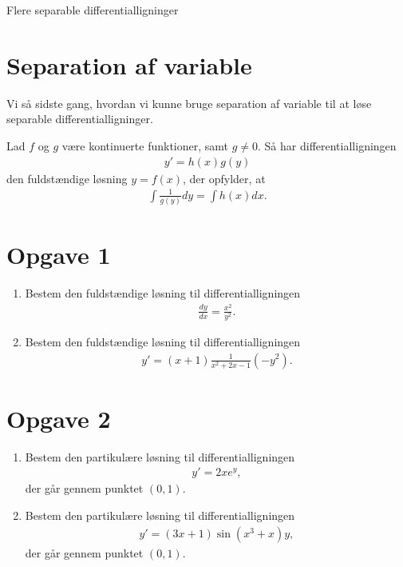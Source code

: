 \begin{center}
\Huge
Flere separable differentialligninger
\end{center}

\section*{Separation af variable}
Vi så sidste gang, hvordan vi kunne bruge separation af variable til at løse separable differentialligninger.
\begin{setn}
	Lad $f$ og $g$ være kontinuerte funktioner, samt $g \neq 0$. 
	Så har differentialligningen
	\begin{align*}
		y' = h(x)g(y)
	\end{align*}
	den fuldstændige løsning $y = f(x)$, der opfylder, at 
	\begin{align*}
		\int \frac{1}{g(y)}dy = \int h(x) dx.
	\end{align*}
\end{setn}


\section*{Opgave 1}
\begin{enumerate}[label=\roman*)]
	\item Bestem den fuldstændige løsning til differentialligningen
	\begin{align*}
		\frac{dy}{dx} = \frac{x^2}{y^2}.
	\end{align*}
	\item Bestem den fuldstændige løsning til differentialligningen
	\begin{align*}
		y' = (x+1)\frac{1}{x^2+2x-1}(-y^2).
	\end{align*}
\end{enumerate}


\section*{Opgave 2}
\begin{enumerate}[label=\roman*)]
	\item Bestem den partikulære løsning til differentialligningen
	\begin{align*}
		y' = 2xe^y,
	\end{align*}
	der går gennem punktet $(0,1)$.
	\item Bestem den partikulære løsning til differentialligningen 
	\begin{align*}
		y' = (3x+1)\sin(x^3+x)y,
	\end{align*}
	der går gennem punktet $(0,1)$. 
\end{enumerate}

